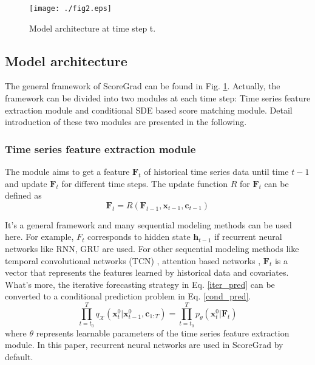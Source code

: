 \begin{figure}[t]
	\centering
	\texttt{[image: ./fig2.eps]} 
	\caption{Model architecture at time step t.}
	\label{Arch}
\end{figure}

\subsection{Model architecture}
The general framework of ScoreGrad can be found in Fig. \ref{Arch}. Actually, the framework can be divided into two modules at each time step:  Time series feature extraction module and conditional SDE based score matching module. Detail introduction of these two modules are presented in the following. 

\subsubsection{Time series feature extraction module} The module aims to get a feature $\textbf{F}_t$ of historical time series data until time $t-1$ and update $\textbf{F}_t$ for different time steps. The update function $R$ for $\textbf{F}_t$ can be defined as 
\begin{equation}\label{F_update}
	\textbf{F}_t = R(\textbf{F}_{t-1}, \textbf{x}_{t-1}, \textbf{c}_{t-1})
\end{equation}

 It's a general framework and many sequential modeling methods can be used here. For example, $F_t$ corresponds to hidden state $\textbf{h}_{t-1}$ if recurrent neural networks like RNN, GRU are used. For other sequential modeling methods like temporal convolutional networks (TCN) \cite{oord2016wavenet}, attention based networks \cite{vaswani2017attention}, $\textbf{F}_t$ is a vector that represents the features learned by historical data and covariates. What's more, the iterative forecasting strategy in Eq. \ref{iter_pred} can be converted to a conditional prediction problem in Eq. \ref{cond_pred}.
\begin{equation}\label{cond_pred}
	\prod_{t=t_0}^Tq_{\mathcal{X}}(\textbf{x}_t^0|\textbf{x}_{t-1}^0, \textbf{c}_{1:T}) = 	\prod_{t=t_0}^Tp_{\theta}(\textbf{x}_t^0|\textbf{F}_{t})
\end{equation}
where $\theta$ represents learnable parameters of the time series feature extraction module. In this paper, recurrent neural networks are used in ScoreGrad by default.


